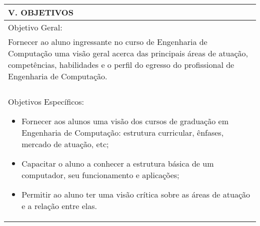 \documentclass[12pt]{article}
\begin{document}
\begin{longtable}{|L{1.025\textwidth}|} \hline
%
{\bf V. OBJETIVOS } \\ \hline
%
Objetivo Geral: \\
Fornecer ao aluno ingressante no curso de Engenharia de Computação uma visão geral acerca das principais áreas de atuação, competências, habilidades e o perfil do egresso do profissional de Engenharia de Computação.\\
\\
Objetivos Específicos:
\begin{itemize}
\item Fornecer aos alunos uma visão dos cursos de graduação em Engenharia de Computação: estrutura curricular, ênfases, mercado de atuação, etc;
\item Capacitar o aluno a conhecer a estrutura básica de um computador, seu funcionamento e aplicações;
\item Permitir ao aluno ter uma visão crítica sobre as áreas de atuação e a relação entre elas.
\end{itemize}
\\ \hline
\end{longtable}
\end{document}
